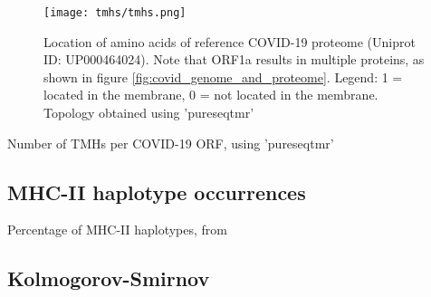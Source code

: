 
\begin{figure}[!htbp]
  \texttt{[image: tmhs/tmhs.png]}
  \caption{
    Location of amino acids of reference COVID-19 
    proteome (Uniprot ID: UP000464024).
    Note that ORF1a results in multiple proteins, 
    as shown in figure \ref{fig:covid_genome_and_proteome}.
    Legend: 1 = located in the membrane, 0 = not located in the membrane.
    Topology obtained using 'pureseqtmr' \cite{pureseqtmr}
  }
  \label{fig:covid_topology}
\end{figure}

\begin{table}[!htbp]
  
  \caption{
    Number of TMHs per COVID-19 ORF,
    using 'pureseqtmr' \cite{pureseqtmr}
  }
  \label{table:covid_tmhs}
\end{table}

\subsection{MHC-II haplotype occurrences}


\begin{table}[!htbp]
  
  \caption{
    Percentage of MHC-II haplotypes, from \cite{greenbaum2011functional}
  }
  \label{table:mhc2_haplotypes}
\end{table}

\subsection{Kolmogorov-Smirnov}

